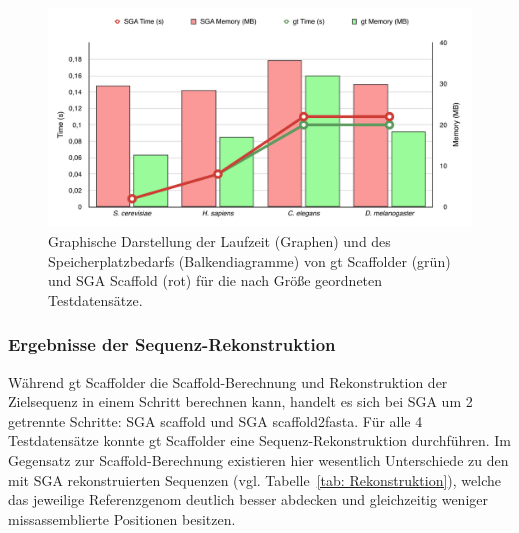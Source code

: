 \documentclass[a4paper,10pt,parskip]{scrartcl}
\begin{document}
\begin{figure}[t]
  \includegraphics[width=\textwidth,height=0.8\textheight,keepaspectratio]{presentation/figures/sga_vs_gt.pdf}
  \caption{\label{abb: Zeit}Graphische Darstellung der Laufzeit (Graphen) und
  des Speicherplatzbedarfs (Balkendiagramme) von gt Scaffolder (grün) und SGA
  Scaffold (rot) für die nach Größe geordneten Testdatensätze. }
\end{figure}


\subsubsection*{Ergebnisse der Sequenz-Rekonstruktion}
Während gt Scaffolder die Scaffold-Berechnung und Rekonstruktion der Zielsequenz
in einem Schritt berechnen kann, handelt es sich bei SGA um 2 getrennte
Schritte: SGA scaffold und SGA scaffold2fasta. Für alle 4 Testdatensätze konnte
gt Scaffolder eine Sequenz-Rekonstruktion durchführen. Im Gegensatz zur
Scaffold-Berechnung existieren hier wesentlich Unterschiede zu den mit SGA
rekonstruierten Sequenzen (vgl. Tabelle~\ref{tab: Rekonstruktion}), welche das
jeweilige Referenzgenom deutlich besser abdecken und gleichzeitig weniger
missassemblierte Positionen besitzen.
\end{document}
